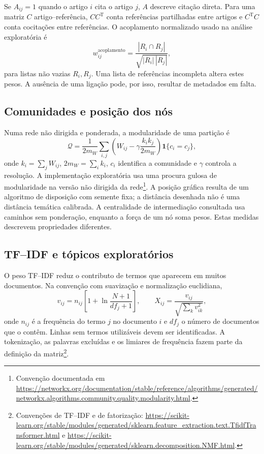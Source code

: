 Se $A_{ij}=1$ quando o artigo $i$ cita o artigo $j$, $A$ descreve citação direta. Para uma matriz $C$ artigo--referência, $CC^{\mathrm T}$ conta referências partilhadas entre artigos e $C^{\mathrm T}C$ conta cocitações entre referências. O acoplamento normalizado usado na análise exploratória é
\begin{equation}
w_{ij}^{\mathrm{acoplamento}}=
\frac{|R_i\cap R_j|}{\sqrt{|R_i|\,|R_j|}},
\label{eq:mat-acoplamento}
\end{equation}
para listas não vazias $R_i,R_j$. Uma lista de referências incompleta altera estes pesos. A ausência de uma ligação pode, por isso, resultar de metadados em falta.

\subsection{Comunidades e posição dos nós}
\label{sec:mat-modularidade}
Numa rede não dirigida e ponderada, a modularidade de uma partição é
\begin{equation}
\mathcal Q=\frac1{2m_W}\sum_{i,j}
\left(W_{ij}-\gamma\frac{k_i k_j}{2m_W}\right)\mathbf1\{c_i=c_j\},
\label{eq:mat-modularidade}
\end{equation}
onde $k_i=\sum_jW_{ij}$, $2m_W=\sum_ik_i$, $c_i$ identifica a comunidade e $\gamma$ controla a resolução. A implementação exploratória usa uma procura gulosa de modularidade na versão não dirigida da rede\footnote{Convenção documentada em \url{https://networkx.org/documentation/stable/reference/algorithms/generated/networkx.algorithms.community.quality.modularity.html}.}. A posição gráfica resulta de um algoritmo de disposição com semente fixa; a distância desenhada não é uma distância temática calibrada. A centralidade de intermediação consultada usa caminhos sem ponderação, enquanto a força de um nó soma pesos. Estas medidas descrevem propriedades diferentes.

\subsection{TF--IDF e tópicos exploratórios}
\label{sec:mat-topicos}
O peso TF--IDF reduz o contributo de termos que aparecem em muitos documentos. Na convenção com suavização e normalização euclidiana,
\begin{equation}
v_{ij}=n_{ij}\left[1+\ln\frac{N+1}{df_j+1}\right],
\qquad X_{ij}=\frac{v_{ij}}{\sqrt{\sum_kv_{ik}^2}},
\label{eq:mat-tfidf}
\end{equation}
onde $n_{ij}$ é a frequência do termo $j$ no documento $i$ e $df_j$ o número de documentos que o contêm. Linhas sem termos utilizáveis devem ser identificadas. A tokenização, as palavras excluídas e os limiares de frequência fazem parte da definição da matriz\footnote{Convenções de TF--IDF e de fatorização: \url{https://scikit-learn.org/stable/modules/generated/sklearn.feature_extraction.text.TfidfTransformer.html} e \url{https://scikit-learn.org/stable/modules/generated/sklearn.decomposition.NMF.html}.}.

